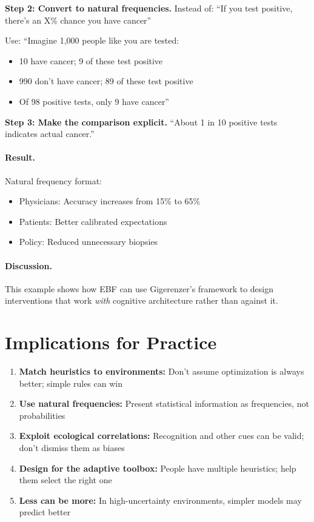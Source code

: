 \textbf{Step 2: Convert to natural frequencies.}
Instead of: ``If you test positive, there's an X\% chance you have cancer''

Use: ``Imagine 1,000 people like you are tested:
\begin{itemize}[nosep]
\item 10 have cancer; 9 of these test positive
\item 990 don't have cancer; 89 of these test positive
\item Of 98 positive tests, only 9 have cancer''
\end{itemize}

\textbf{Step 3: Make the comparison explicit.}
``About 1 in 10 positive tests indicates actual cancer.''

\paragraph{Result.}
Natural frequency format:
\begin{itemize}[nosep]
\item Physicians: Accuracy increases from 15\% to 65\%
\item Patients: Better calibrated expectations
\item Policy: Reduced unnecessary biopsies
\end{itemize}

\paragraph{Discussion.}
This example shows how EBF can use Gigerenzer's framework to design interventions that work \textit{with} cognitive architecture rather than against it.


\section{Implications for Practice}
\label{sec:gi-practice}

\begin{tcolorbox}[colback=green!5!white, colframe=green!75!black,
    title=Practical Implications]
\begin{enumerate}
\item \textbf{Match heuristics to environments:} Don't assume optimization is always better; simple rules can win
\item \textbf{Use natural frequencies:} Present statistical information as frequencies, not probabilities
\item \textbf{Exploit ecological correlations:} Recognition and other cues can be valid; don't dismiss them as biases
\item \textbf{Design for the adaptive toolbox:} People have multiple heuristics; help them select the right one
\item \textbf{Less can be more:} In high-uncertainty environments, simpler models may predict better
\end{enumerate}
\end{tcolorbox}



